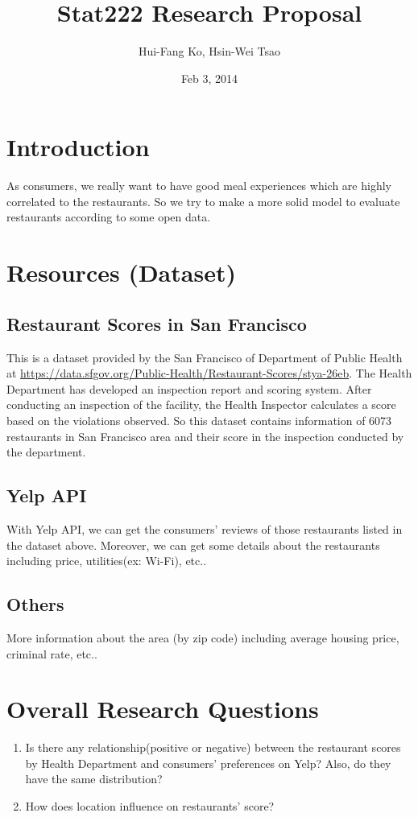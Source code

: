 \documentclass{article}
\title{Stat222 Research Proposal}
\author{Hui-Fang Ko, Hsin-Wei Tsao}
\date{Feb 3, 2014}
\begin{document}
\maketitle

\section{Introduction}
As consumers, we really want to have good meal experiences which are highly correlated to the restaurants. So we try to make a more solid model to evaluate restaurants according to some open data.



\section{Resources (Dataset)}
\subsection{Restaurant Scores in San Francisco}
This is a dataset provided by the San Francisco of Department of Public Health at \url{https://data.sfgov.org/Public-Health/Restaurant-Scores/stya-26eb}. The Health Department has developed an inspection report and scoring system. After conducting an inspection of the facility, the Health Inspector calculates a score based on the violations observed. So this dataset contains information of 6073 restaurants in San Francisco area and their score in the inspection conducted by the department.

\subsection{Yelp API}
With Yelp API, we can get the consumers' reviews of those restaurants listed in the dataset above. Moreover, we can get some details about the restaurants including price, utilities(ex: Wi-Fi), etc.. 

\subsection{Others}
More information about the area (by zip code) including average housing price, criminal rate, etc..

\section{Overall Research Questions}

\begin{enumerate}
  \item Is there any relationship(positive or negative) between the restaurant scores by Health Department and consumers' preferences on Yelp? Also, do they have  the same distribution?
  \item How does location influence on restaurants' score?
\end{enumerate}
\end{document}

